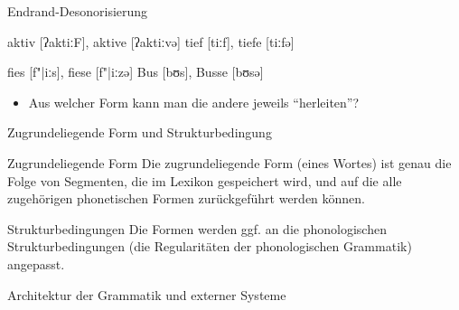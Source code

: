\begin{frame}
  {Endrand-Desonorisierung}
  \pause
  \begin{exe}
    \ex
    \begin{xlist}
    \end{xlist}
    \ex
    \begin{xlist}
    \end{xlist}
    \ex
    \begin{xlist}
    \end{xlist}
    \ex
    \begin{xlist}
      \ex aktiv [ʔaktiː\alert{F}], aktive [ʔaktiː\alert{v}ə]
      \ex tief [tiː\alert{f}], tiefe [tiː\alert{f}ə]
    \end{xlist}
    \ex
    \begin{xlist}
      \ex fies [f"|iː\alert{s}], fiese [f"|iː\alert{z}ə]
      \ex Bus [bʊ\alert{s}], Busse [bʊ\alert{s}ə]
    \end{xlist}
  \end{exe}
  \pause
  \Zeile
  \begin{itemize}
    \item \alert{Aus welcher Form kann man die andere jeweils "`herleiten"'?}
  \end{itemize}
\end{frame}


\begin{frame}
  {Zugrundeliegende Form und Strukturbedingung}
  \pause
  \Large
  \begin{block}{Zugrundeliegende Form}    
    Die zugrundeliegende Form (eines Wortes) ist genau die Folge von Segmenten, die im Lexikon gespeichert wird, und auf die alle zugehörigen phonetischen Formen zurückgeführt werden können.
  \end{block}
  \pause
  \Zeile
  \begin{block}{Strukturbedingungen}
    Die Formen werden ggf. an die phonologischen Strukturbedingungen (die Regularitäten der phonologischen Grammatik) angepasst.    
  \end{block}
\end{frame}

\begin{frame}
  {Architektur der Grammatik und externer Systeme}
  \pause
  \centering
\end{frame}

